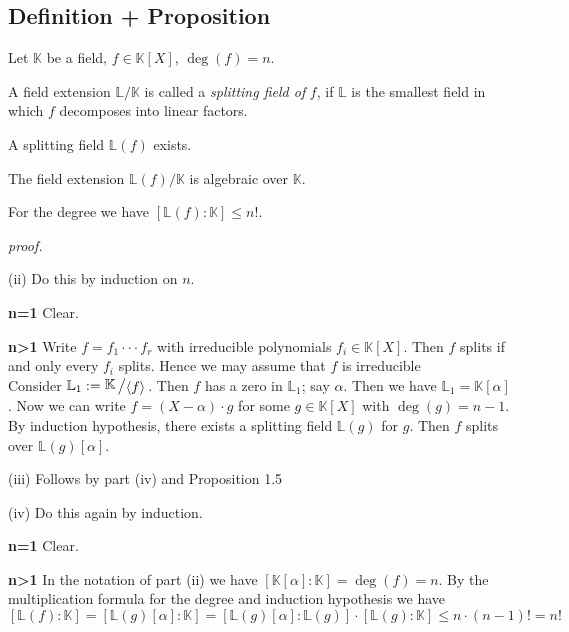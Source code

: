 \documentclass[12pt]{book}
\newcommand{\slant}[2]{{\raisebox{.1em}{$#1$}\left/\raisebox{-.1em}{$#2$}\right.}}
\begin{document}
\begin{spacing}{1.3}
\subsection{Definition + Proposition} %
Let $\mathbb{K}$ be a field, $f \in \mathbb{K}[X]$, $\deg(f)=n$.
\begin{compactenum}
\item A field extension $\mathbb{L}/\mathbb{K}$ is called a \textit{splitting field of} $f$, if $\mathbb{L}$ is the smallest field in which $f$ decomposes into linear factors.
\item A splitting field $\mathbb{L}(f)$ exists.
\item The field extension $\mathbb{L}(f)/\mathbb{K}$ is algebraic over $\mathbb{K}$.
\item For the degree we have $[\mathbb{L}(f):\mathbb{K}] \leqslant n!$.
\end{compactenum}
\textit{proof.}
\begin{compactenum}
\item[(ii)] Do this by induction on $n$.
\begin{compactenum}
\item[\textbf{n=1}] Clear.
\item[\textbf{n>1}] Write $f= f_1 \cdot \cdot \cdot f_r$ with irreducible polynomials $f_i \in \mathbb{K}[X]$. Then $f$ splits if and only every $f_i$ splits. Hence we may assume that $f$ is irreducible\\
Consider $\mathbb{L}_1:=\slant{\mathbb{K}}{\langle f \rangle}$. Then $f$ has a zero in $\mathbb{L}_1$; say $\alpha$. Then we have $\mathbb{L}_1=\mathbb{K}[\alpha]$. Now we can write $f = (X-\alpha) \cdot g$ for some $g \in \mathbb{K}[X]$ with $\deg(g)=n-1$. By induction hypothesis, there exists a splitting field $\mathbb{L}(g)$ for $g$. Then $f$ splits over $\mathbb{L}(g)[\alpha]$.
\end{compactenum}
\item[(iii)] Follows by part (iv) and Proposition 1.5
\item[(iv)] Do this again by induction.
\begin{compactenum}
\item[\textbf{n=1}] Clear.
\item[\textbf{n>1}] In the notation of part (ii) we have $[\mathbb{K}[\alpha]:\mathbb{K}]=\deg(f)=n$. By the multiplication formula for the degree and induction hypothesis we have
$$[\mathbb{L}(f):\mathbb{K}]=[\mathbb{L}(g)[\alpha]:\mathbb{K}]=[\mathbb{L}(g)[\alpha]:\mathbb{L}(g)] \cdot [\mathbb{L}(g): \mathbb{K}] \leqslant n \cdot (n-1)!=n!$$
\end{compactenum}


\end{compactenum}
\end{spacing}
\end{document}
